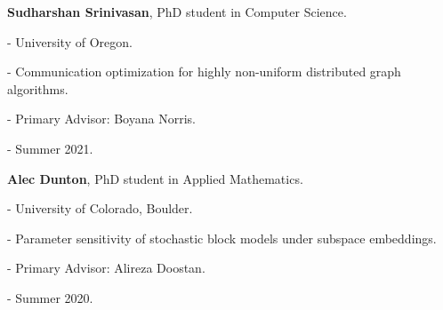 \begin{innerlist}
  \item[] \textbf{Sudharshan Srinivasan},
  PhD student in Computer Science.
  \begin{innerlist}
    \item[-] University of Oregon.
    \item[-] Communication optimization for highly non-uniform distributed graph algorithms.
    \item[-] Primary Advisor: Boyana Norris.
    \item[-] Summer 2021.
  \end{innerlist}

  \item[] \textbf{Alec Dunton},
  PhD student in Applied Mathematics.
  \begin{innerlist}
    \item[-] University of Colorado, Boulder.
    \item[-] Parameter sensitivity of stochastic block models under subspace embeddings.
    \item[-] Primary Advisor: Alireza Doostan.
    \item[-] Summer 2020.
  \end{innerlist}

\end{innerlist}
